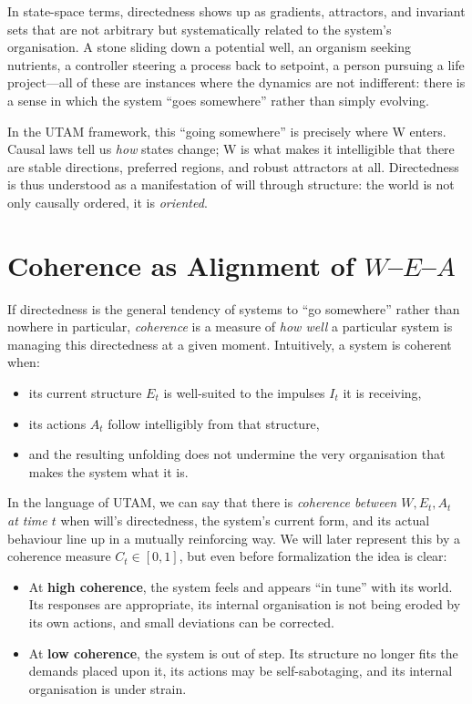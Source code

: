 \documentclass[12pt,a4paper]{report}
\newcommand{\Will}{W}
\newcommand{\Struct}{E}
\newcommand{\Act}{A}
\newcommand{\Ct}{C_t}
\begin{document}
In state-space terms, directedness shows up as gradients, attractors, and invariant sets that are not arbitrary but systematically related to the system's organisation. A stone sliding down a potential well, an organism seeking nutrients, a controller steering a process back to setpoint, a person pursuing a life project---all of these are instances where the dynamics are not indifferent: there is a sense in which the system ``goes somewhere'' rather than simply evolving.

In the UTAM framework, this ``going somewhere'' is precisely where \Will{} enters. Causal laws tell us \emph{how} states change; \Will{} is what makes it intelligible that there are stable directions, preferred regions, and robust attractors at all. Directedness is thus understood as a manifestation of will through structure: the world is not only causally ordered, it is \emph{oriented}.

\section{Coherence as Alignment of \(W\)–\(E\)–\(A\)}

If directedness is the general tendency of systems to ``go somewhere'' rather than nowhere in particular, \emph{coherence} is a measure of \emph{how well} a particular system is managing this directedness at a given moment. Intuitively, a system is coherent when:

\begin{itemize}[leftmargin=2em]
    \item its current structure \(\Struct_t\) is well-suited to the impulses \(I_t\) it is receiving,
    \item its actions \(\Act_t\) follow intelligibly from that structure,
    \item and the resulting unfolding does not undermine the very organisation that makes the system what it is.
\end{itemize}

In the language of UTAM, we can say that there is \emph{coherence between \(\Will, \Struct_t, \Act_t\) at time \(t\)} when will's directedness, the system's current form, and its actual behaviour line up in a mutually reinforcing way. We will later represent this by a coherence measure \(\Ct \in [0,1]\), but even before formalization the idea is clear:


\begin{itemize}[leftmargin=2em]
    \item At \textbf{high coherence}, the system feels and appears ``in tune'' with its world. Its responses are appropriate, its internal organisation is not being eroded by its own actions, and small deviations can be corrected.
    \item At \textbf{low coherence}, the system is out of step. Its structure no longer fits the demands placed upon it, its actions may be self-sabotaging, and its internal organisation is under strain.
\end{itemize}
\end{document}
